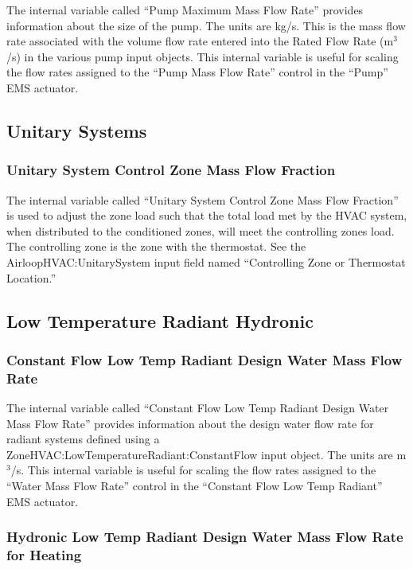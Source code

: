 The internal variable called ``Pump Maximum Mass Flow Rate'' provides information about the size of the pump. The units are kg/s. This is the mass flow rate associated with the volume flow rate entered into the Rated Flow Rate (m\(^{3}\)/s) in the various pump input objects. This internal variable is useful for scaling the flow rates assigned to the ``Pump Mass Flow Rate'' control in the ``Pump'' EMS actuator.

\subsection{Unitary Systems}\label{unitary-systems}

\subsubsection{Unitary System Control Zone Mass Flow Fraction}\label{unitary-system-control-zone-mass-flow-fraction}

The internal variable called ``Unitary System Control Zone Mass Flow Fraction'' is used to adjust the zone load such that the total load met by the HVAC system, when distributed to the conditioned zones, will meet the controlling zones load. The controlling zone is the zone with the thermostat. See the AirloopHVAC:UnitarySystem input field named ``Controlling Zone or Thermostat Location.''

\subsection{Low Temperature Radiant Hydronic}\label{low-temperature-radiant-hydronic-000}

\subsubsection{Constant Flow Low Temp Radiant Design Water Mass Flow Rate}\label{constant-flow-low-temp-radiant-design-water-mass-flow-rate}

The internal variable called ``Constant Flow Low Temp Radiant Design Water Mass Flow Rate'' provides information about the design water flow rate for radiant systems defined using a ZoneHVAC:LowTemperatureRadiant:ConstantFlow input object. The units are m\(^{3}\)/s. This internal variable is useful for scaling the flow rates assigned to the ``Water Mass Flow Rate'' control in the ``Constant Flow Low Temp Radiant'' EMS actuator.

\subsubsection{Hydronic Low Temp Radiant Design Water Mass Flow Rate for Heating}\label{hydronic-low-temp-radiant-design-water-mass-flow-rate-for-heating}

